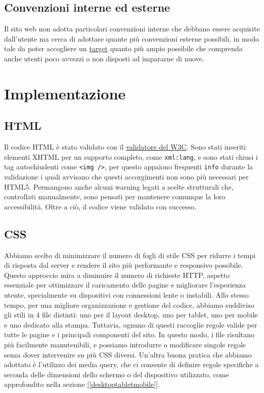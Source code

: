 \documentclass{article}
\begin{document}
\subsection{Convenzioni interne ed esterne}
Il sito web non adotta particolari convenzioni interne che debbano essere acquisite dall'utente ma cerca di adottare quante più convenzioni esterne possibili, in modo tale da poter accogliere un \hyperref[target]{target} quanto più ampio possibile che comprenda anche utenti poco avvezzi o non disposti ad impararne di nuove.
\section{Implementazione}
\subsection{HTML}
Il codice HTML è stato validato con il \href{https://validator.w3.org/}{validatore del W3C}.
Sono stati inseriti elementi XHTML per un supporto completo, come \verb|xml:lang|, e sono stati chiusi i tag autochiudenti come \verb|<img />|, per questo appaiono frequenti \verb|info| durante la validazione i quali avvisano che questi accorgimenti non sono più necessari per HTML5. Permangono anche alcuni warning legati a scelte strutturali che, controllati manualmente, sono pensati per mantenere comunque la loro accessibilità. Oltre a ciò, il codice viene validato con successo.
\newpage
\subsection{CSS}
Abbiamo scelto di minimizzare il numero di fogli di stile CSS per ridurre i tempi di risposta dal server e rendere il sito più performante e responsivo possibile. Questo approccio mira a diminuire il numero di richieste HTTP, aspetto essenziale per ottimizzare il caricamento delle pagine e migliorare l'esperienza utente, specialmente su dispositivi con connessioni lente o instabili. Allo stesso tempo, per una migliore organizzazione e gestione del codice, abbiamo suddiviso gli stili in 4 file distinti: uno per il layout desktop, uno per tablet, uno per mobile e uno dedicato alla stampa. Tuttavia, ognuno di questi raccoglie regole valide per tutte le pagine e i principali componenti del sito. In questo modo, i file risultano più facilmente manutenibili, e possiamo introdurre o modificare singole regole senza dover intervenire su più CSS diversi. Un'altra buona pratica che abbiamo adottato è l'utilizzo dei media query, che ci consente di definire regole specifiche a seconda delle dimensioni dello schermo o del dispositivo utilizzato, come approfondito nella sezione [\ref{desktoptabletmobile}].
\end{document}
